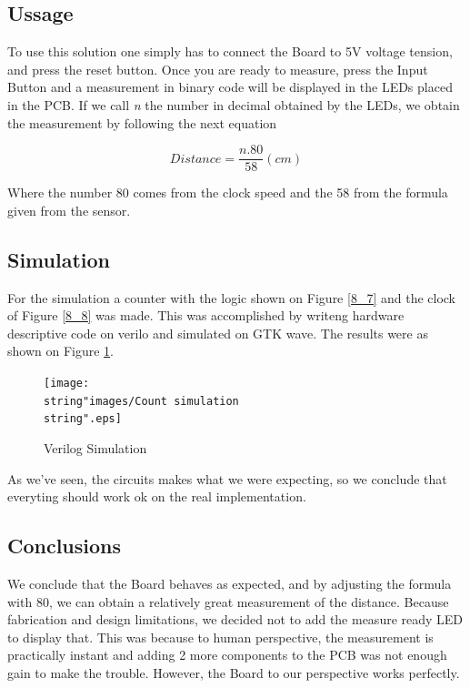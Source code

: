 \subsection{Ussage}

To use this solution one simply has to connect the Board to 5V voltage
tension, and press the reset button. Once you are ready to measure,
press the Input Button and a measurement in binary code will be displayed
in the LEDs placed in the PCB. If we call \emph{n} the number in decimal
obtained by the LEDs, we obtain the measurement by following the next
equation

\[
Distance=\frac{n.80}{58}(cm)
\]

Where the number 80 comes from the clock speed and the 58 from the
formula given from the sensor.

\subsection{Simulation}

For the simulation a counter with the logic shown on Figure \ref{8_7}
and the clock of Figure \ref{8_8} was made. This was accomplished
by writeng hardware descriptive code on verilo and simulated on GTK
wave. The results were as shown on Figure \ref{8_13}.

\begin{figure}[H]
\begin{centering}
\texttt{[image: \\string"images/Count simulation\\string".eps]}
\par\end{centering}
\caption{Verilog Simulation}
\label{8_13}

\end{figure}

As we've seen, the circuits makes what we were expecting, so we conclude
that everyting should work ok on the real implementation.

\subsection{Conclusions}

We conclude that the Board behaves as expected, and by adjusting the
formula with 80, we can obtain a relatively great measurement of the
distance. Because fabrication and design limitations, we decided not
to add the measure ready LED to display that. This was because to
human perspective, the measurement is practically instant and adding
2 more components to the PCB was not enough gain to make the trouble.
However, the Board to our perspective works perfectly.
